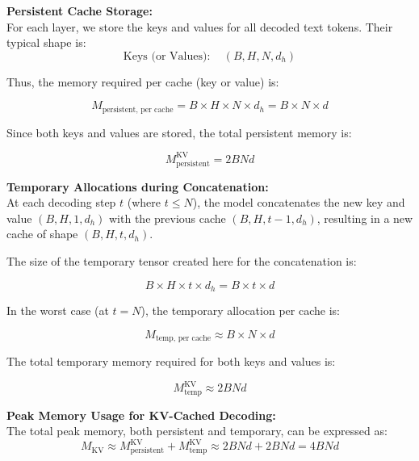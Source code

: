 \documentclass[times, review, 10pt]{elsarticle}
\begin{document}
\smallskip
\textbf{Persistent Cache Storage:} \\
For each layer, we store the keys and values for all decoded text tokens. Their typical shape is:
\begin{equation}
\label{eq:app-beam-kv-shape}
\text{Keys (or Values)} : \quad (B, H, N, d_h)
\end{equation}

Thus, the memory required per cache (key or value) is:

\begin{equation}
\label{eq:app-beam-kv-persistent-percache}
M_{\text{persistent, per cache}} = B \times H \times N \times d_h = B \times N \times d
\end{equation}

Since both keys and values are stored, the total persistent memory is:

\begin{equation}
\label{eq:app-beam-kv-persistent-total}
M_{\text{persistent}}^{\mathrm{KV}} = 2 B N d
\end{equation}

\smallskip
\noindent \textbf{Temporary Allocations during Concatenation:} \\
At each decoding step \( t \) (where \( t \leq N \)), the model concatenates the new key and value 
\( (B, H, 1, d_h) \) with the previous cache \( (B, H, t-1, d_h) \), resulting in a new cache of shape \( (B, H, t, d_h) \).

The size of the temporary tensor created here for the concatenation is:

\begin{equation}
\label{eq:app-beam-kv-temp-size}
B \times H \times t \times d_h = B \times t \times d
\end{equation}

In the worst case (at \( t = N \)), the temporary allocation per cache is:

\begin{equation}
\label{eq:app-beam-kv-temp-percache}
M_{\text{temp, per cache}} \approx B \times N \times d
\end{equation}

The total temporary memory required for both keys and values is:

\begin{equation}
\label{eq:app-beam-kv-temp-total}
M_{\mathrm{temp}}^{\mathrm{KV}} \approx 2 B N d
\end{equation}

\smallskip
\noindent \textbf{Peak Memory Usage for KV-Cached Decoding:} \\
The total peak memory, both persistent and temporary, can be expressed as:
\begin{equation}
\label{eq:app-beam-kv-peak}
M_{\mathrm{KV}} \approx M_{\text{persistent}}^{\mathrm{KV}} + M_{\mathrm{temp}}^{\mathrm{KV}} 
\approx 2 B N d + 2 B N d = 4 B N d
\end{equation}
\end{document}
